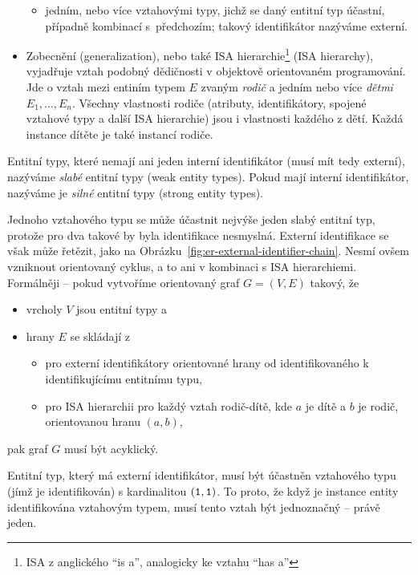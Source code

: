\begin{itemize}
\begin{itemize}
          \item jedním, nebo více vztahovými typy, jichž se daný entitní typ účastní, případně kombinací s~předchozím; takový identifikátor nazýváme externí.
        \end{itemize}
  \item Zobecnění (generalization), nebo také ISA hierarchie\footnote{ISA z anglického \enquote{is a}, analogicky ke vztahu \enquote{has a}} (ISA hierarchy), vyjadřuje vztah podobný dědičnosti v objektově orientovaném programování.
        Jde o vztah mezi entiním typem $E$ zvaným \emph{rodič} a jedním nebo více \emph{dětmi} $E_1, \dots, E_n$.
        Všechny vlastnosti rodiče (atributy, identifikátory, spojené vztahové typy a další ISA hierarchie) jsou i vlastnosti každého z dětí.
        Každá instance dítěte je také instancí rodiče.
\end{itemize}

Entitní typy, které nemají ani jeden interní identifikátor (musí mít tedy externí), nazýváme \emph{slabé} entitní typy (weak entity types).
Pokud mají interní identifikátor, nazýváme je \emph{silné} entitní typy (strong entity types).

Jednoho vztahového typu se může účastnit nejvýše jeden slabý entitní typ, protože pro dva takové by byla identifikace nesmyslná.
Externí identifikace se však může řetězit, jako na Obrázku~\ref{fig:er-external-identifier-chain}.
Nesmí ovšem vzniknout orientovaný cyklus, a to ani v kombinaci s ISA hierarchiemi.
Formálněji -- pokud vytvoříme orientovaný graf $G=(V,E)$ takový, že
\begin{itemize}
  \item vrcholy $V$ jsou entitní typy a
  \item hrany $E$ se skládají z
        \begin{itemize}
          \item pro externí identifikátory orientované hrany od identifikovaného k identifikujícímu entitnímu typu,
          \item pro ISA hierarchii pro každý vztah rodič-dítě, kde $a$ je dítě a $b$ je rodič, orientovanou hranu $(a, b)$,
        \end{itemize}
\end{itemize}
pak graf $G$ musí být acyklický.

Entitní typ, který má externí identifikátor, musí být účastněn vztahového typu (jímž je identifikován) s kardinalitou $(\texttt{1},\texttt{1})$.
To proto, že když je instance entity identifikována vztahovým typem, musí tento vztah být jednoznačný -- právě jeden.

